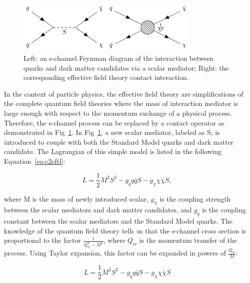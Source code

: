 \begin{figure}[htbp]
  \begin{center}
    \includegraphics[width=0.8\textwidth]{chapters/c2/figures/eft-feyn-diagram}
  \end{center}
  \caption{Left: an s-channel Feynman diagram of the interaction between quarks and dark matter candidates via a scalar mediator; Right: the corresponding effective field theory contact interaction.}
  \label{fig:c2eftfeyndiagram}
\end{figure}

In the context of particle physics, the effective field theory are simplifications of the complete quantum field theories where the mass of interaction mediator is large enough with respect to the momentum exchange of a physical process. Therefore, the s-channel process can be replaced by a contact operator as demonstrated in Fig~\ref{fig:c2eftfeyndiagram}. In Fig~\ref{fig:c2eftfeyndiagram}, a new scalar mediator, labeled as S, is introduced to couple with both the Standard Model quarks and dark matter candidate. The Lagrangian of this simple model is listed in the following Equation~\ref{eq:c2eftl}:

\begin{equation}
  L = \frac{1}{2}M^{2}S^{2}-g_{q}q\bar{q}S-g_{\chi}\chi\bar{\chi}S,
  \label{eq:c2eftl}
\end{equation}

where M is the mass of newly introduced scalar, $g_{\chi}$ is the coupling strength between the scalar mediators and dark matter candidates, and $g_{q}$ is the coupling constant between the scalar mediators and the Standard Model quarks. The knowledge of the quantum field theory tells us that the s-channel cross section is proportional to the factor $\frac{1}{Q_{tr}^{2}-M^{2}}$, where $Q_{tr}$ is the momentum transfer of the process. Using Taylor expansion, this factor can be expanded in powers of $\frac{Q_{tr}}{M}$: 

\begin{equation}
  L = \frac{1}{2}M^{2}S^{2}-g_{q}q\bar{q}S-g_{\chi}\chi\bar{\chi}S
  \label{eq:c2taylorexp}
\end{equation}

